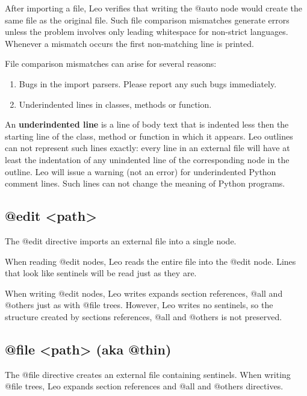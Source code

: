\documentclass[a4paper,10pt,english]{sphinxmanual}
\begin{document}
After importing a file, Leo verifies that writing the @auto node would create
the same file as the original file. Such file comparison mismatches
generate errors unless the problem involves only leading whitespace for
non-strict languages. Whenever a mismatch occurs the first non-matching line is
printed.

File comparison mismatches can arise for several reasons:
\begin{enumerate}
\item {} 
Bugs in the import parsers. Please report any such bugs immediately.

\item {} 
Underindented lines in classes, methods or function.

\end{enumerate}

An \textbf{underindented line} is a line of body text that is indented less then the
starting line of the class, method or function in which it appears. Leo outlines
can not represent such lines exactly: every line in an external file will have
at least the indentation of any unindented line of the corresponding node in the
outline. Leo will issue a warning (not an error) for underindented Python
comment lines. Such lines can not change the meaning of Python programs.


\subsection{@edit \textless{}path\textgreater{}}
\label{directives:edit-path}
The @edit directive imports an external file into a single node.

When reading @edit nodes, Leo reads the entire file into the @edit node. Lines
that look like sentinels will be read just as they are.

When writing @edit nodes, Leo writes expands section references, @all and
@others just as with @file trees. However, Leo writes no sentinels, so the
structure created by sections references, @all and @others is not preserved.


\subsection{@file \textless{}path\textgreater{} (aka @thin)}
\label{directives:file-path-aka-thin}
The @file directive creates an external file containing sentinels. When writing
@file trees, Leo expands section references and @all and @others directives.
\end{document}
